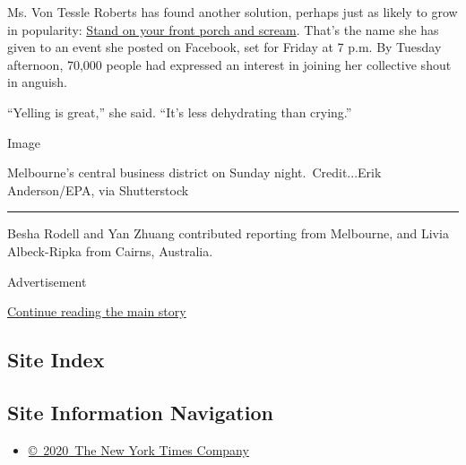 Ms. Von Tessle Roberts has found another solution, perhaps just as
likely to grow in popularity:
\href{https://www.facebookcorewwwi.onion/events/2738223623055680/}{Stand
on your front porch and scream}. That's the name she has given to an
event she posted on Facebook, set for Friday at 7 p.m. By Tuesday
afternoon, 70,000 people had expressed an interest in joining her
collective shout in anguish.

``Yelling is great,'' she said. ``It's less dehydrating than crying.''

Image

Melbourne's central business district on Sunday night.~Credit...Erik
Anderson/EPA, via Shutterstock

\begin{center}\rule{0.5\linewidth}{\linethickness}\end{center}

Besha Rodell and Yan Zhuang contributed reporting from Melbourne, and
Livia Albeck-Ripka from Cairns, Australia.

Advertisement

\protect\hyperlink{after-bottom}{Continue reading the main story}

\hypertarget{site-index}{%
\subsection{Site Index}\label{site-index}}

\hypertarget{site-information-navigation}{%
\subsection{Site Information
Navigation}\label{site-information-navigation}}

\begin{itemize}
\tightlist
\item
  \href{https://help.nytimes3xbfgragh.onion/hc/en-us/articles/115014792127-Copyright-notice}{©~2020~The
  New York Times Company}
\end{itemize}

